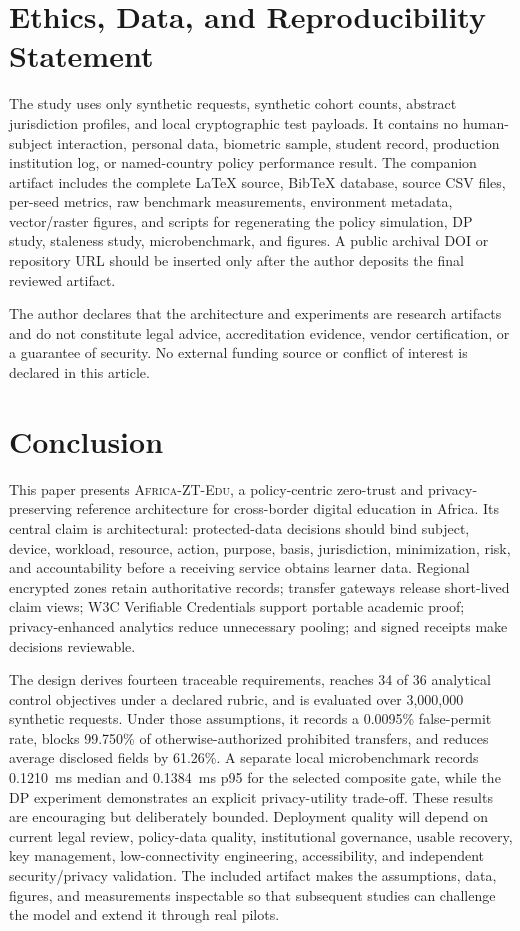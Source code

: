 \documentclass[journal]{IEEEtran}
\newcommand{\system}{\textsc{Africa-ZT-Edu}\xspace}
\begin{document}
\section{Ethics, Data, and Reproducibility Statement}
The study uses only synthetic requests, synthetic cohort counts, abstract jurisdiction profiles, and local cryptographic test payloads. It contains no human-subject interaction, personal data, biometric sample, student record, production institution log, or named-country policy performance result. The companion artifact includes the complete \LaTeX{} source, Bib\TeX{} database, source CSV files, per-seed metrics, raw benchmark measurements, environment metadata, vector/raster figures, and scripts for regenerating the policy simulation, DP study, staleness study, microbenchmark, and figures. A public archival DOI or repository URL should be inserted only after the author deposits the final reviewed artifact.

The author declares that the architecture and experiments are research artifacts and do not constitute legal advice, accreditation evidence, vendor certification, or a guarantee of security. No external funding source or conflict of interest is declared in this article.

\section{Conclusion}
This paper presents \system, a policy-centric zero-trust and privacy-preserving reference architecture for cross-border digital education in Africa. Its central claim is architectural: protected-data decisions should bind subject, device, workload, resource, action, purpose, basis, jurisdiction, minimization, risk, and accountability before a receiving service obtains learner data. Regional encrypted zones retain authoritative records; transfer gateways release short-lived claim views; W3C Verifiable Credentials support portable academic proof; privacy-enhanced analytics reduce unnecessary pooling; and signed receipts make decisions reviewable.

The design derives fourteen traceable requirements, reaches 34 of 36 analytical control objectives under a declared rubric, and is evaluated over 3,000,000 synthetic requests. Under those assumptions, it records a 0.0095\% false-permit rate, blocks 99.750\% of otherwise-authorized prohibited transfers, and reduces average disclosed fields by 61.26\%. A separate local microbenchmark records 0.1210~ms median and 0.1384~ms p95 for the selected composite gate, while the DP experiment demonstrates an explicit privacy-utility trade-off. These results are encouraging but deliberately bounded. Deployment quality will depend on current legal review, policy-data quality, institutional governance, usable recovery, key management, low-connectivity engineering, accessibility, and independent security/privacy validation. The included artifact makes the assumptions, data, figures, and measurements inspectable so that subsequent studies can challenge the model and extend it through real pilots.
\end{document}
